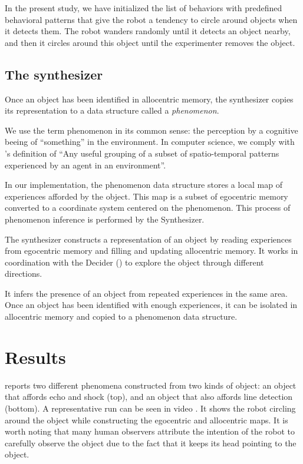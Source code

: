 \documentclass[pmlr]{jmlr}%
\begin{document}
In the present study, we have initialized the list of behaviors with predefined behavioral patterns that give the robot a tendency to circle around objects when it detects them. 
The robot wanders randomly until it detects an object nearby, and then it circles around this object until the experimenter removes the object. 


\subsection{The synthesizer}
\label{sec:synthesizer}


Once an object has been identified in allocentric memory, the synthesizer copies its representation to a data structure called a \textit{phenomenon}.

We use the term phenomenon in its common sense: the perception by a cognitive beeing of ``something'' in the environment.
In computer science, we comply with \cite{thorisson_explanation_2021}'s definition of ``Any useful grouping of a subset of spatio-temporal patterns experienced by an agent in an environment''.

In our implementation, the phenomenon data structure stores a local map of experiences afforded by the object. 
This map is a subset of egocentric memory converted to a coordinate system centered on the phenomenon.
This process of phenomenon inference is performed by the Synthesizer.

The synthesizer constructs a representation of an object by reading experiences from egocentric memory and filling and updating allocentric memory. 
It works in coordination with the Decider () to explore the object through different directions. 

It infers the presence of an object from repeated experiences in the same area. 
Once an object has been identified with enough experiences, it can be isolated in allocentric memory and copied to a phenomenon data structure.

\section{Results}

 reports two different phenomena constructed from two kinds of object: an object that affords echo and shock (top), and an object that also affords line detection (bottom).
A representative run can be seen in video \citep{titouan_knockaert_demonstration_2022}.
It shows the robot circling around the object while constructing the egocentric and allocentric maps. 
It is worth noting that many human observers attribute the intention of the robot to carefully observe the object due to the fact that it keeps its head pointing to the object. 
\end{document}
